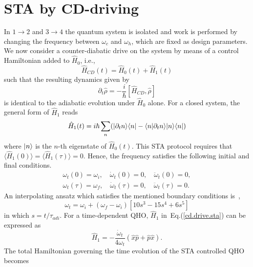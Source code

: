 \documentclass[aps,pra,twocolumn,showpacs,showkeys,groupedaddress,nobalancelastpage,nofootinbib,floatfix,superscriptaddress,longbibliography]{revtex4-2}
\begin{document}
\section{STA by CD-driving}
\label{sec:sta}
In $1\rightarrow 2$ and $3\rightarrow 4$ the quantum system is isolated and work is performed by changing the frequency between $\omega_c$ and $\omega_h$, which are fixed as design parameters. We now consider a counter-diabatic drive on the system by means of a control Hamiltonian added to $\hat{H}_0$, i.e.,
\begin{equation}\label{cd.ham.sta}
\hat{H}_{CD}(t) = \hat{H}_0(t) + \hat{H}_1(t)
\end{equation}
such that the resulting dynamics given by
\begin{equation}\label{eq.mo.sta}
   \partial_t{\hat{\rho}} = -\frac{i}{\hbar}[\hat{H}_{CD},\hat{\rho}]
\end{equation}
is identical to the adiabatic evolution under $\hat{H}_0$ alone. 
For a closed system, the general form of $\hat{H}_1$ reads~\cite{Berry_2009}
\begin{equation}\label{cd.drive.sta}
 \hat{H}_1(t) = i\hbar \sum_n (|\partial_t n\rangle\langle n| - \langle n|\partial_t n\rangle|n\rangle\langle n|)
\end{equation}
where $|n\rangle$ is the $n$-th eigenstate of $\hat{H}_0(t)$. This STA protocol requires that $\langle \hat{H}_1(0)\rangle = \langle \hat{H}_1(\tau)\rangle = 0$. Hence, the frequency satisfies the following initial and final conditions.
\begin{align}\label{bc.sta}
  \omega_t(0)=\omega_i,\quad \dot{\omega}_t(0)=0, \quad \ddot{\omega}_t(0)=0,\nonumber  \\
  \omega_t(\tau)=\omega_f,\quad \dot{\omega}_t(\tau)=0, \quad \ddot{\omega}_t(\tau)=0.
\end{align}
An interpolating ansatz which satisfies the mentioned boundary conditions is~\cite{PhysRevX.4.021013},
\begin{equation}\label{freq.ansazt.sta}
   \omega_t = \omega_i + (\omega_f - \omega_i)[10s^3-15s^4+6s^5]
\end{equation}
in which $s=t/\tau_{adi}$. For a time-dependent QHO, $\hat{H}_1$ in~Eq.(\ref{cd.drive.sta}) can be expressed as~\cite{Muga_2010}
\begin{equation}\label{qho.h1.sta}
\hat{H}_1 = -\frac{\dot{\omega}_t}{4\omega_t}(\hat{x}\hat{p}+\hat{p}\hat{x}).
\end{equation}
The total Hamiltonian governing the time evolution of the STA controlled QHO becomes
\end{document}
